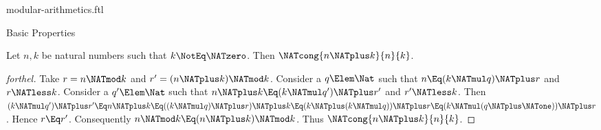 \documentclass{stex}
\begin{document}
\begin{smodule}{modular-arithmetics.ftl}
\begin{sfragment}{Basic Properties}
  \begin{proposition}[forthel,id=ARITHMETIC_08_5984712287846400]
    Let $n, k$ be natural numbers such that $k \NotEq \NATzero$.
    Then $\NATcong{n \NATplus k}{n}{k}$.
  \end{proposition}
  \begin{proof}[forthel]
    Take $r = n \NATmod k$ and $r' = (n \NATplus k) \NATmod k$.
    Consider a $q \Elem \Nat$ such that $n \Eq (k \NATmul q) \NATplus r$ and $r \NATless k$.
    Consider a $q' \Elem \Nat$ such that $n \NATplus k \Eq (k \NATmul q') \NATplus r'$ and
    $r' \NATless k$.
    Then $(k \NATmul q') \NATplus r'
      \Eq n \NATplus k
      \Eq ((k \NATmul q) \NATplus r) \NATplus k
      \Eq (k \NATplus (k \NATmul q)) \NATplus r
      \Eq (k \NATmul (q \NATplus \NATone)) \NATplus r$.
    Hence $r \Eq r'$.
    Consequently $n \NATmod k \Eq (n \NATplus k) \NATmod k$.
    Thus $\NATcong{n \NATplus k}{n}{k}$.
  \end{proof}
\end{sfragment}
\end{smodule}
\end{document}
